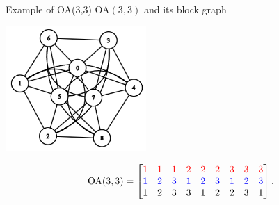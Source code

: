 \documentclass{beamer}
\begin{document}
\begin{frame}{Example of OA(3,3)}
\centering
OA$(3,3)$ and its block graph

\vspace{1em}

\includegraphics[width=0.4\textwidth]{slides/graph.png}

\[
\begin{aligned}
    \text{OA}(3,3) = \begin{bmatrix}
        \textcolor{red}{1}&\textcolor{red}{1}&\textcolor{red}{1}&\textcolor{red}{2}&\textcolor{red}{2}&\textcolor{red}{2}&\textcolor{red}{3}&\textcolor{red}{3}&\textcolor{red}{3}\\
        \textcolor{blue}{1}&\textcolor{blue}{2}&\textcolor{blue}{3}&\textcolor{blue}{1}&\textcolor{blue}{2}&\textcolor{blue}{3}&\textcolor{blue}{1}&\textcolor{blue}{2}&\textcolor{blue}{3}\\
        1&2&3&3&1&2&2&3&1
    \end{bmatrix}.
\end{aligned}
\]
\end{frame}
\end{document}
